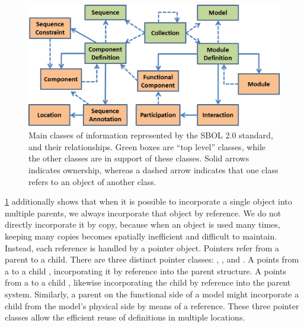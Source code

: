 \begin{figure}[ht]
\begin{center}
\includegraphics[scale=0.85]{images/OverviewFig2-v4.png}
\caption{Main classes of information represented by the SBOL 2.0 standard, and their relationships.  Green boxes are ``top level'' classes, while the other classes are in support of these classes. Solid arrows indicates ownership, whereas a dashed arrow indicates that one class refers to an object of another class.}
\label{images:overview2}
\end{center}
\end{figure}

\ref{images:overview2} additionally shows that when it is possible to incorporate a single object into multiple parents, we always incorporate that object by reference. We do not directly incorporate it by copy, because when an object is used many times, keeping many copies becomes spatially inefficient and difficult to maintain.
Instead, each reference is handled by a pointer object. 
Pointers refer from a parent to a child. There are three distinct pointer classes: , , and . A  points from a  to a child , incorporating it by reference into the parent structure. A  points from a  to a child , likewise incorporating the child by reference into the parent system. Similarly, a parent  on the functional side of a model might incorporate a child  from the model's physical side by means of a  reference. These three pointer classes allow the efficient reuse of definitions in multiple locations.

